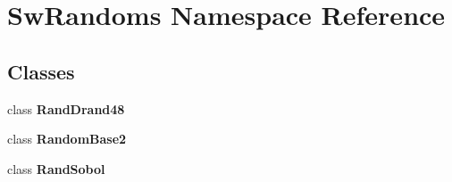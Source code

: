 \section{SwRandoms Namespace Reference}
\label{namespaceSwRandoms}


\subsection*{Classes}
\begin{CompactItemize}
\item 
class {\bf RandDrand48}
\item 
class {\bf RandomBase2}
\item 
class {\bf RandSobol}
\end{CompactItemize}
